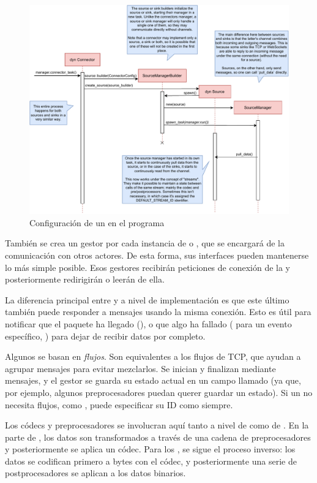 \begin{figure}
    \centering
    \includegraphics[width=\textwidth]{./Imagenes/setting-up.pdf}
    \caption{Configuración de un \connector en el programa}%
    \label{fig:tremor_setting_up}
\end{figure}

También se crea un gestor por cada instancia de \sink o \source, que se
encargará de la comunicación con otros actores. De esta forma, sus interfaces
pueden mantenerse lo más simple posible. Esos gestores recibirán peticiones de
conexión de la \pipeline y posteriormente redirigirán o leerán de ella.

La diferencia principal entre \sources y \sinks a nivel de implementación es que
este último también puede responder a mensajes usando la misma conexión. Esto es
útil para notificar que el paquete ha llegado (), o que algo ha
fallado ( para un evento específico, ) para
dejar de recibir datos por completo.

Algunos \connectors se basan en \emph{flujos}. Son equivalentes a los flujos de
TCP, que ayudan a agrupar mensajes para evitar mezclarlos. Se inician y
finalizan mediante mensajes, y el gestor se guarda su estado actual en un campo
llamado  (ya que, por ejemplo, algunos preprocesadores puedan
querer guardar un estado). Si un \connector no necesita flujos, como
, puede especificar su ID como  siempre.

Los códecs y preprocesadores se involucran aquí tanto a nivel de \source como de
\sink. En la parte de \source, los datos son transformados a través de una
cadena de preprocesadores y posteriormente se aplica un códec. Para los \sinks,
se sigue el proceso inverso: los datos se codifican primero a bytes con el
códec, y posteriormente una serie de postprocesadores se aplican a los datos
binarios.

